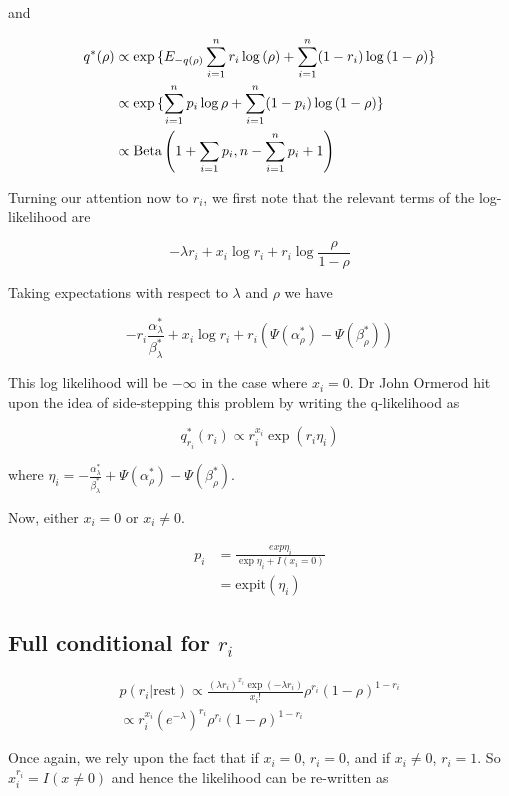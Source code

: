 \documentclass{amsart}
\begin{document}
and

\begin{align*}
q^*(\rho) &\propto \exp{\{ E_{-q(\rho)} \sum_{i=1}^n r_i \log{(\rho)} + \sum_{i=1}^n (1- r_i) \log{(1 - \rho)} \}} \\
&\propto \exp{\{ \sum_{i=1}^n p_i \log{\rho} + \sum_{i=1}^n (1 - p_i) \log{(1 - \rho)} \}} \\
&\propto \text{Beta} \left( 1+ \sum_{i=1} p_i, n - \sum_{i=1}^n p_i + 1 \right)
\end{align*}

Turning our attention now to $r_i$, we first note that the relevant terms of the
log-likelihood are

$$
-\lambda r_i + x_i \log{r_i} + r_i \log{\frac{\rho}{1 - \rho}}
$$

Taking expectations with respect to $\lambda$ and $\rho$ we have

$$
-r_i \frac{\alpha_\lambda^*}{\beta_\lambda^*} + x_i \log{r_i} + r_i (\Psi(\alpha_\rho^*) - \Psi(\beta_\rho^*))
$$

This log likelihood will be $-\infty$ in the case where $x_i = 0$. Dr John Ormerod hit
upon the idea of side-stepping this problem by writing the q-likelihood as

$$
q_{r_i}^*(r_i) \propto r_i^{x_i} \exp{(r_i \eta_i)}
$$

where $\eta_i = - \frac{\alpha_\lambda^*}{\beta_\lambda^*} + \Psi(\alpha_\rho^*) - \Psi(\beta_\rho^*)$.

Now, either $x_i = 0$ or $x_i \ne 0$.

\begin{align*}
p_i &= \frac{exp{\eta_i}}{\exp{\eta_i} + I(x_i = 0)} \\
&= \text{expit}(\eta_i)
\end{align*}

\subsection{Full conditional for $r_i$}
\begin{align*}
p(r_i | \text{rest}) \propto \frac{(\lambda r_i)^{x_i} \exp{(-\lambda r_i)}}{x_i !} \rho^{r_i} (1 - \rho)^{1 - r_i} \\
\propto r_i^{x_i} (e^{-\lambda})^{r_i} \rho^{r_i} (1 - \rho)^{1 - r_i}
\end{align*}

Once again, we rely upon the fact that if $x_i = 0$, $r_i = 0$, and if $x_i \ne 0$,
$r_i = 1$. So $x_i^{r_i} = I(x \ne 0)$ and hence the likelihood can be re-written as
\end{document}
